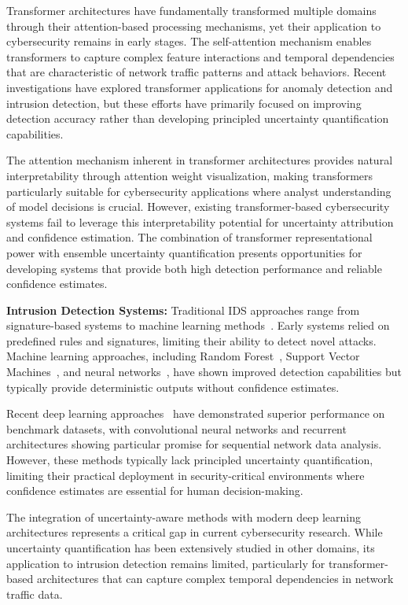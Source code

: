 \documentclass[journal]{IEEEtran}
\begin{document}
Transformer architectures have fundamentally transformed multiple domains through their attention-based processing mechanisms, yet their application to cybersecurity remains in early stages. The self-attention mechanism enables transformers to capture complex feature interactions and temporal dependencies that are characteristic of network traffic patterns and attack behaviors. Recent investigations have explored transformer applications for anomaly detection and intrusion detection, but these efforts have primarily focused on improving detection accuracy rather than developing principled uncertainty quantification capabilities.

The attention mechanism inherent in transformer architectures provides natural interpretability through attention weight visualization, making transformers particularly suitable for cybersecurity applications where analyst understanding of model decisions is crucial. However, existing transformer-based cybersecurity systems fail to leverage this interpretability potential for uncertainty attribution and confidence estimation. The combination of transformer representational power with ensemble uncertainty quantification presents opportunities for developing systems that provide both high detection performance and reliable confidence estimates.

\textbf{Intrusion Detection Systems:} Traditional IDS approaches range from signature-based systems to machine learning methods~\cite{buczak2016survey}. Early systems relied on predefined rules and signatures, limiting their ability to detect novel attacks. Machine learning approaches, including Random Forest~\cite{breiman2001random}, Support Vector Machines~\cite{mukkamala2002intrusion}, and neural networks~\cite{cannady1998artificial}, have shown improved detection capabilities but typically provide deterministic outputs without confidence estimates.

Recent deep learning approaches~\cite{vinayakumar2017deep} have demonstrated superior performance on benchmark datasets, with convolutional neural networks and recurrent architectures showing particular promise for sequential network data analysis. However, these methods typically lack principled uncertainty quantification, limiting their practical deployment in security-critical environments where confidence estimates are essential for human decision-making.

The integration of uncertainty-aware methods with modern deep learning architectures represents a critical gap in current cybersecurity research. While uncertainty quantification has been extensively studied in other domains, its application to intrusion detection remains limited, particularly for transformer-based architectures that can capture complex temporal dependencies in network traffic data.
\end{document}
